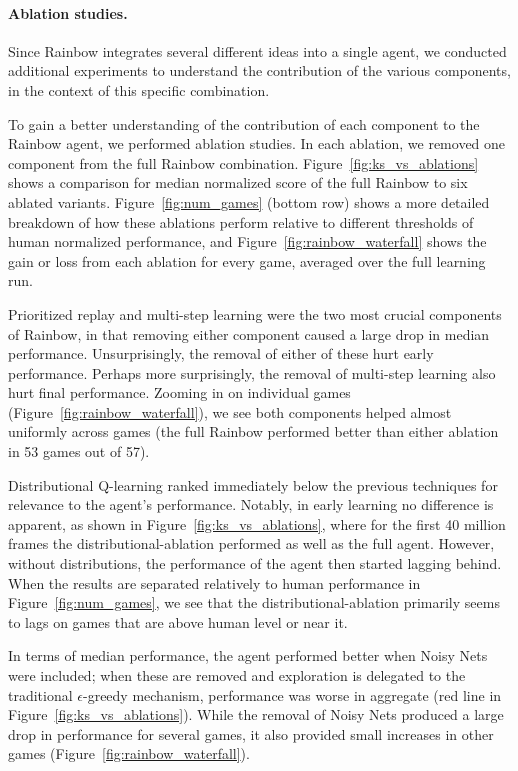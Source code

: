 \documentclass[letterpaper]{article} %
\begin{document}
\paragraph{Ablation studies.}
\label{ablation}
Since Rainbow integrates several different ideas into a single agent, we conducted additional experiments to understand the contribution of the various components, in the context of this specific combination. 

To gain a better understanding of the contribution of each component to the Rainbow agent, we performed ablation studies. In each ablation, we removed one component from the full Rainbow combination.
Figure~\ref{fig:ks_vs_ablations} shows a comparison for median normalized score of the full Rainbow to six ablated variants. Figure~\ref{fig:num_games} (bottom row) shows a more detailed breakdown of how these ablations perform relative to different thresholds of human normalized performance, and Figure~\ref{fig:rainbow_waterfall} shows the gain or loss from each ablation for every game, averaged over the full learning run.

Prioritized replay and multi-step learning were the two most crucial components of Rainbow, in that removing either component caused a large drop in median performance. Unsurprisingly, the removal of either of these hurt early performance. Perhaps more surprisingly, the removal of multi-step learning also hurt final performance. Zooming in on individual games (Figure~\ref{fig:rainbow_waterfall}), we see both components helped almost uniformly across games (the full Rainbow performed better than either ablation in 53 games out of 57).

Distributional Q-learning ranked immediately below the previous techniques for relevance to the agent's performance. Notably, in early learning no difference is apparent, as shown in Figure~\ref{fig:ks_vs_ablations}, where for the first 40 million frames the distributional-ablation performed as well as the full agent.  However, without distributions, the performance of the agent then started lagging behind.  When the results are separated relatively to human performance in Figure~\ref{fig:num_games}, we see that the distributional-ablation primarily seems to lags on games that are above human level or near it.

In terms of median performance, the agent performed better when Noisy Nets were included; when these are removed and exploration is delegated to the traditional $\epsilon$-greedy mechanism, performance was worse in aggregate (red line in Figure~\ref{fig:ks_vs_ablations}). While the removal of Noisy Nets produced a large drop in performance for several games, it also provided small increases in other games (Figure~\ref{fig:rainbow_waterfall}).
\end{document}
